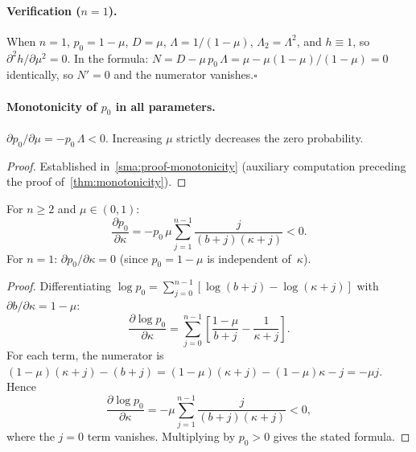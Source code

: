 \paragraph{Verification ($n = 1$).}
When $n = 1$, $p_0 = 1 - \mu$, $D = \mu$,
$\Lambda = 1/(1-\mu)$, $\Lambda_2 = \Lambda^2$, and $h \equiv 1$, so
$\partial^2 h/\partial\mu^2 = 0$. In the formula: $N = D - \mu\,p_0\,\Lambda
= \mu - \mu(1-\mu)/(1-\mu) = 0$ identically, so $N' = 0$ and the
numerator vanishes.\enspace$\square$


\paragraph{Monotonicity of $p_0$ in all parameters.}

\begin{proposition}[Monotonicity of $p_0$ in $\mu$]\label{sma:prop-p0-mu}
  $\partial p_0/\partial\mu = -p_0\,\Lambda < 0$.
  Increasing $\mu$ strictly decreases the zero probability.
\end{proposition}

\begin{proof}
  Established in~\cref{sma:proof-monotonicity} (auxiliary computation
  preceding the proof of~\cref{thm:monotonicity}).
\end{proof}

\begin{proposition}\label{sma:prop-p0-kappa}
  For $n \ge 2$ and $\mu \in (0,1)$:
  \begin{equation}\label{sma:eq-dp0-dkappa}
    \frac{\partial p_0}{\partial\kappa}
    = -p_0\,\mu\sum_{j=1}^{n-1}\frac{j}{(b+j)(\kappa+j)} < 0.
  \end{equation}
  For $n = 1$: $\partial p_0/\partial\kappa = 0$ (since
  $p_0 = 1 - \mu$ is independent of~$\kappa$).
\end{proposition}

\begin{proof}
  Differentiating
  $\log p_0 = \sum_{j=0}^{n-1}[\log(b+j) - \log(\kappa+j)]$
  with $\partial b/\partial\kappa = 1-\mu$:
  \[
    \frac{\partial\log p_0}{\partial\kappa}
    = \sum_{j=0}^{n-1}
      \left[\frac{1-\mu}{b+j} - \frac{1}{\kappa+j}\right].
  \]
  For each term, the numerator is
  $(1-\mu)(\kappa+j) - (b+j) = (1-\mu)(\kappa+j) - (1-\mu)\kappa - j = -\mu j$.
  Hence
  \[
    \frac{\partial\log p_0}{\partial\kappa}
    = -\mu\sum_{j=1}^{n-1}\frac{j}{(b+j)(\kappa+j)} < 0,
  \]
  where the $j = 0$ term vanishes. Multiplying by $p_0 > 0$ gives the
  stated formula.
\end{proof}

